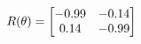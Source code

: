 \documentclass[preview]{standalone}
\begin{document}
\begin{align*}
\special{dvisvgm:raw <g id='unique000'>}R(\theta) = \begin{bmatrix}-0.99 & -0.14\\0.14 & -0.99\end{bmatrix}\special{dvisvgm:raw </g>}
\end{align*}
\end{document}
